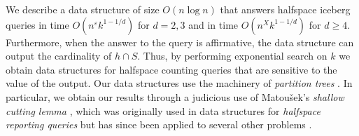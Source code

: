 \documentclass[lotsofwhite]{patmorin}
\newcommand{\eps}{\varepsilon}
\begin{document}
We describe a data structure of size $O(n\log n)$ that answers
halfspace iceberg queries in time $O(n^\eps k^{1-1/d})$ for $d=2,3$
and in time $O(n^{X}k^{1-1/d})$ for $d\ge 4$.  Furthermore, when the
answer to the query is affirmative, the data structure can output the
cardinality of $h\cap S$. Thus, by performing exponential search on
$k$ we obtain data structures for halfspace counting queries that are
sensitive to the value of the output.  Our data structures use the
machinery of \emph{partition trees} \cite{many-matouseks,welzl}.  In
particular, we obtain our results through a judicious use of
Matou\v{s}ek's \emph{shallow cutting lemma} \cite{matousek-shallow},
which was originally used in data structures for \emph{halfspace
reporting queries} but has since been applied to several other
problems \cite{ramos,chan1,chan2}.
\end{document}
